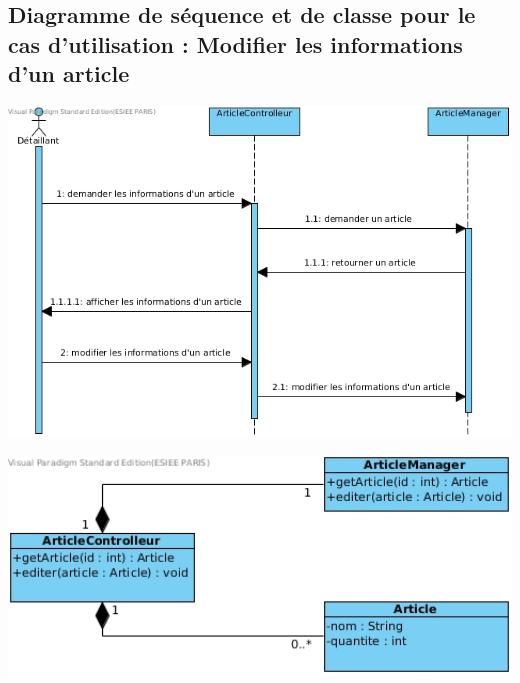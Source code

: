 \subsection{Diagramme de séquence et de classe pour le cas d'utilisation : Modifier les informations d'un article}
\begin{center}
	\includegraphics[width=14cm]{Analyse/DiagrammeSequenceModifierInfoArticle.jpg}
\end{center}
\begin{center}
	\includegraphics[width=14cm]{Analyse/DiagrammeDeClasseModifierInfoArticle.jpg}
\end{center}


